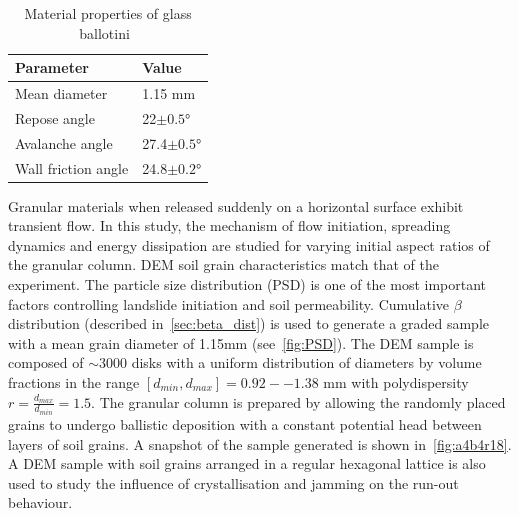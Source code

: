 \begin{table}[tbhp]
\caption{Material properties of glass ballotini~\citep{Lajeunesse2004}}
\label{table:mat_prop}
\centering
\begin{tabular}{ll}
\toprule
\textbf{Parameter} & \textbf{Value} \\ \midrule
Mean diameter & 1.15 \si{\mm} \\
Repose angle & 22$\pm 0.5$\si{\degree} \\
Avalanche angle & 27.4$\pm 0.5$\si{\degree} \\
Wall friction angle & 24.8$\pm 0.2$\si{\degree}\\
\bottomrule
\end{tabular}
\end{table}


Granular materials when released suddenly on a 
horizontal surface exhibit transient flow. In this study, the mechanism of flow 
initiation, spreading dynamics and energy dissipation are studied for varying 
initial aspect ratios of the granular column. DEM soil grain characteristics 
match that of the experiment. The particle size distribution (PSD) is one of 
the most important factors controlling landslide initiation and soil 
permeability. Cumulative $\beta$ distribution (described 
in~\cref{sec:beta_dist}) %
 is used to generate a graded sample with a mean grain diameter of 1.15\si{\mm} 
 (see~\cref{fig:PSD}). 
The DEM sample is composed of $\sim3000$ disks with a uniform distribution of 
diameters by volume fractions in the range $[d_{min}, d_{max}] = 0.92 -- 1.38$ 
\si{\mm} with polydispersity $r = \frac{d_{max} }{d_{min}} = 1.5$. The 
granular column is prepared by allowing the randomly placed grains to undergo 
ballistic deposition with a constant potential head between layers of soil 
grains. A snapshot of the sample generated is shown in~\cref{fig:a4b4r18}. A 
DEM sample with soil grains arranged in a regular hexagonal lattice is also 
used to study the influence of crystallisation and jamming on the run-out 
behaviour.

